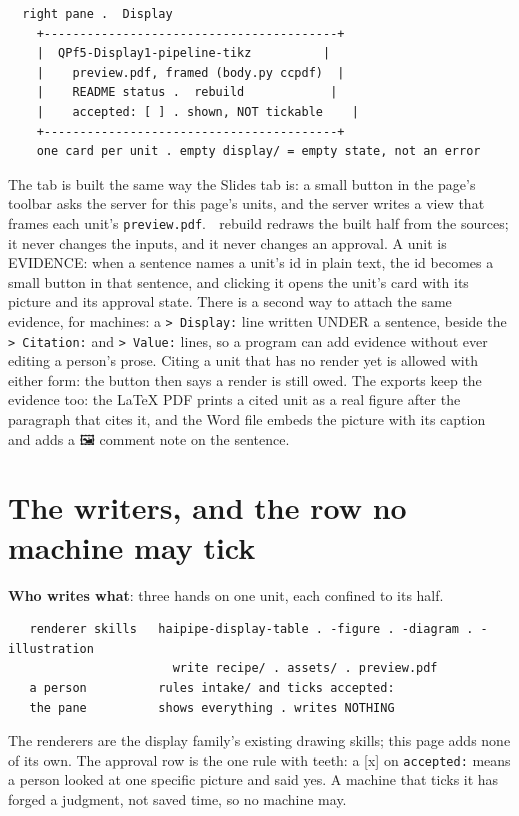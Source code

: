 \begin{verbatim}
  right pane .  Display
    +-----------------------------------------+
    |  QPf5-Display1-pipeline-tikz          |
    |    preview.pdf, framed (body.py ccpdf)  |
    |    README status .  rebuild            |
    |    accepted: [ ] . shown, NOT tickable    |
    +-----------------------------------------+
    one card per unit . empty display/ = empty state, not an error
\end{verbatim}
The tab is built the same way the Slides tab is: a small button in the page's toolbar asks the server for this page's units, and the server writes a view that frames each unit's \texttt{preview.pdf}. 🔄 rebuild redraws the built half from the sources; it never changes the inputs, and it never changes an approval. A unit is EVIDENCE: when a sentence names a unit's id in plain text, the id becomes a small button in that sentence, and clicking it opens the unit's card with its picture and its approval state. There is a second way to attach the same evidence, for machines: a \texttt{> Display:} line written UNDER a sentence, beside the \texttt{> Citation:} and \texttt{> Value:} lines, so a program can add evidence without ever editing a person's prose. Citing a unit that has no render yet is allowed with either form: the button then says a render is still owed. The exports keep the evidence too: the LaTeX PDF prints a cited unit as a real figure after the paragraph that cites it, and the Word file embeds the picture with its caption and adds a 🖼 comment note on the sentence.


\section{The writers, and the row no machine may tick}
\textbf{Who writes what}: three hands on one unit, each confined to its half.

\begin{verbatim}
   renderer skills   haipipe-display-table . -figure . -diagram . -illustration
                       write recipe/ . assets/ . preview.pdf
   a person          rules intake/ and ticks accepted:
   the pane          shows everything . writes NOTHING
\end{verbatim}
The renderers are the display family's existing drawing skills; this page adds none of its own. The approval row is the one rule with teeth: a [x] on \texttt{accepted:} means a person looked at one specific picture and said yes. A machine that ticks it has forged a judgment, not saved time, so no machine may.


